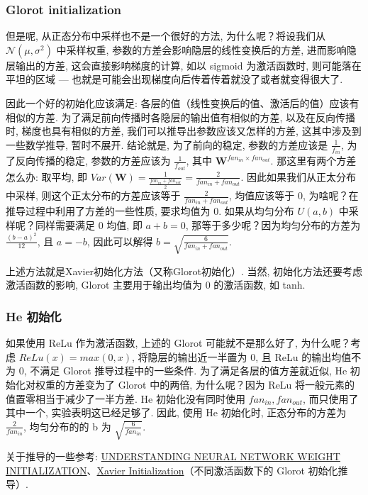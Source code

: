 \subsubsection{Glorot initialization}
但是呢, 从正态分布中采样也不是一个很好的方法, 为什么呢？将设我们从 $\mathcal{N}(\mu, \sigma^2)$ 中采样权重, 参数的方差会影响隐层的线性变换后的方差, 进而影响隐层输出的方差, 这会直接影响梯度的计算, 如以 sigmoid 为激活函数时, 则可能落在平坦的区域 --- 也就是可能会出现梯度向后传着传着就没了或者就变得很大了. 

因此一个好的初始化应该满足: 各层的值（线性变换后的值、激活后的值）应该有相似的方差. 为了满足前向传播时各隐层的输出值有相似的方差, 以及在反向传播时, 梯度也具有相似的方差, 我们可以推导出参数应该又怎样的方差, 这其中涉及到一些数学推导, 暂时不展开. 结论就是, 为了前向的稳定, 参数的方差应该是 $\frac{1}{f_{in}}$, 为了反向传播的稳定, 参数的方差应该为 $\frac{1}{f_{out}}$, 其中 $\boldsymbol{W}^{fan_{in} \times fan_{out}}$. 那这里有两个方差怎么办: 取平均, 即 $Var(\boldsymbol{W}) = \frac{1}{ \frac{fan_{in} + fan_{out}}{2}}  = \frac{2}{fan_{in} + fan_{out}}$. 因此如果我们从正太分布中采样, 则这个正太分布的方差应该等于 $\frac{2}{fan_{in} + fan_{out}}$, 均值应该等于 0, 为啥呢？在推导过程中利用了方差的一些性质, 要求均值为 0. 如果从均匀分布 $U(a, b)$ 中采样呢？同样需要满足 0 均值, 即 $a + b = 0$, 那等于多少呢？因为均匀分布的方差为 $\frac{(b - a)^2}{12}$, 且 $a = -b$, 因此可以解得 $b = \sqrt{\frac{6}{fan_{in} + fan_{out}}}$. 

上述方法就是Xavier初始化方法（又称Glorot初始化）. 当然, 初始化方法还要考虑激活函数的影响, Glorot 主要用于输出均值为 0 的激活函数, 如 tanh. 

\subsubsection{He 初始化}
如果使用 ReLu 作为激活函数, 上述的 Glorot 可能就不是那么好了, 为什么呢？考虑 $ReLu(x) = max(0, x)$, 将隐层的输出近一半置为 0, 且 ReLu 的输出均值不为 0, 不满足 Glorot 推导过程中的一些条件. 为了满足各层的值方差就近似, He 初始化对权重的方差变为了 Glorot 中的两倍, 为什么呢？因为 ReLu 将一般元素的值置零相当于减少了一半方差. He 初始化没有同时使用 $fan_{in}, fan_{out}$, 而只使用了其中一个, 实验表明这已经足够了. 因此, 使用 He 初始化时, 正态分布的方差为 $\frac{2}{fan_{in}}$, 均匀分布的的 b 为 $\sqrt{\frac{6}{fan_{in}}}$. 

关于推导的一些参考: \href{https://intoli.com/blog/neural-network-initialization/}{UNDERSTANDING NEURAL NETWORK WEIGHT INITIALIZATION}、\href{https://mnsgrg.com/2017/12/21/xavier-initialization/}{Xavier Initialization}（不同激活函数下的 Glorot 初始化推导）. 


